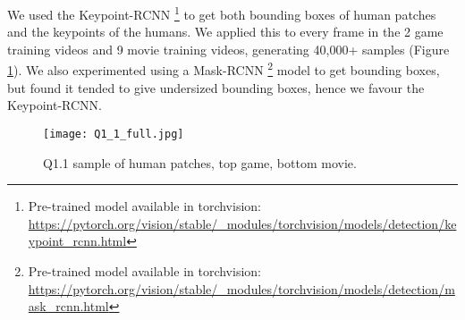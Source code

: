 We used the Keypoint-RCNN
\footnote{Pre-trained model available in torchvision: \url{https://pytorch.org/vision/stable/_modules/torchvision/models/detection/keypoint_rcnn.html}}
 to get both bounding boxes of human patches and the keypoints of the humans.
We applied this to every frame in the 2 game training videos and 9 movie training videos, generating 40,000+ samples (Figure \ref{fig:Q1_1}).
We also experimented using a Mask-RCNN
\footnote{Pre-trained model available in torchvision: \url{https://pytorch.org/vision/stable/_modules/torchvision/models/detection/mask_rcnn.html}}
 model to get bounding boxes, but found it tended to give undersized bounding boxes, hence we favour the Keypoint-RCNN.



\begin{figure}[h!]
  \begin{center}
  \texttt{[image: Q1\_1\_full.jpg]}
    \caption{Q1.1 sample of human patches, top game, bottom movie.}
    \label{fig:Q1_1}
  \end{center}
  \end{figure}